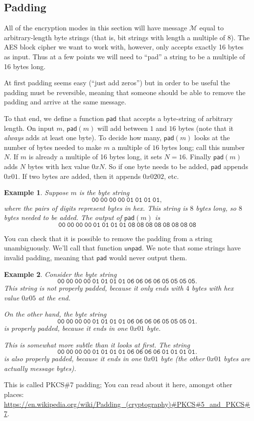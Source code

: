\documentclass[11pt]{article}
\newtheorem{example}{Example}
\newcommand{\msgs}{\mathcal{M}}
\newcommand{\pad}{\mathsf{pad}}
\newcommand{\unpad}{\mathsf{unpad}}
\begin{document}
\subsection{Padding}

All of the encryption modes in this section will have message $\msgs$ equal to
arbitrary-length byte strings (that is, bit strings with length a multiple of
$8$).  The AES block cipher we want to work with, however, only accepts exactly
16 bytes as input. Thus at a few points we will need to ``pad'' a string to be
a multiple of 16 bytes long.

At first padding seems easy (``just add zeros'') but in order to be useful
the padding must be reversible, meaning that someone should be able to remove
the padding and arrive at the same message.

To that end, we define a function $\pad$ that accepts a byte-string of
arbitrary length. On input $m$, $\pad(m)$ will add between $1$ and $16$ bytes
(note that it \emph{always} adds at least one byte). To decide how many,
$\pad(m)$ looks at the number of bytes needed to make $m$ a multiple of $16$
bytes long; call this number $N$. If $m$ is already a multiple of 16 bytes
long, it sets $N=16$. Finally $\pad(m)$ adds $N$ bytes with hex value $0xN$.
So if one byte needs to be added, $\pad$ appends $0x01$. If two bytes are
added, then it appends $0x0202$, etc.

\begin{example}
    Suppose $m$ is the byte string 
    \[
        \mathtt{00\ 00\ 00\ 00\ 01\ 01\ 01\ 01},
    \]
    where the pairs of digits represent bytes in hex.
    This string is $8$ bytes long, so $8$ bytes needed to be added.
    The output of $\pad(m)$ is
    \[
        \mathtt{00\ 00\ 00\ 00\ 01\ 01\ 01\ 01\ 08\ 08\ 08\ 08\ 08\ 08\ 08\ 08}
    \]
\end{example}

You can check that it is possible to remove the padding from a string
unambiguously. We'll call that function $\unpad$. We note that some strings
have invalid padding, meaning that $\pad$ would never output them.
\begin{example}
    Consider the byte string
    \[
        \mathtt{00\ 00\ 00\ 00\ 01\ 01\ 01\ 01\ 06\ 06\ 06\ 06\ 05\ 05\ 05\ 05}.
    \]
    This string is not properly padded, because it only ends with $4$ bytes
    with hex value $0x05$ at the end.

    On the other hand, the byte string
    \[
        \mathtt{00\ 00\ 00\ 00\ 01\ 01\ 01\ 01\ 06\ 06\ 06\ 06\ 05\ 05\ 05\ 01}.
    \]
    \emph{is} properly padded, because it ends in one $0x01$ byte.

    This is somewhat more subtle than it looks at first. The string
    \[
        \mathtt{00\ 00\ 00\ 00\ 01\ 01\ 01\ 01\ 06\ 06\ 06\ 06\ 01\ 01\ 01\ 01}.
    \]
    is also properly padded, because it ends in one $0x01$ byte (the other
    $0x01$ bytes are actually message bytes).
\end{example}
This is called PKCS\#7 padding; You can read about it here, amongst other
places:
\url{https://en.wikipedia.org/wiki/Padding_(cryptography)#PKCS#5_and_PKCS#7}.
\end{document}
